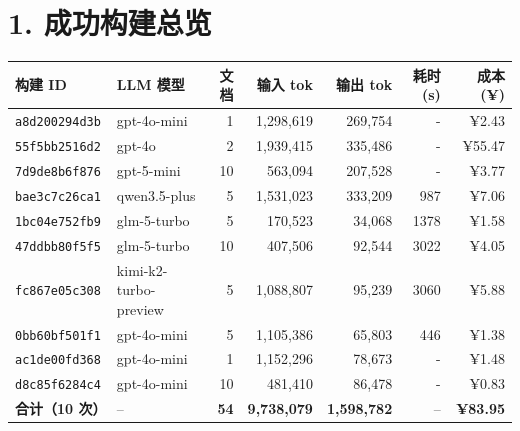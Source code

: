 \documentclass[11pt]{article}
\begin{document}
\section*{1. 成功构建总览}
\noindent\begin{tabularx}{\textwidth}{@{}l X r r r r r@{}}
\toprule
\rowcolor{headerbg!10}\textbf{构建 ID} & \textbf{LLM 模型} & \textbf{文档} & \textbf{输入 tok} & \textbf{输出 tok} & \textbf{耗时(s)} & \textbf{成本(¥)} \\
\midrule
\rowcolor{rowalt}\texttt{\small a8d200294d3b} & \small gpt-4o-mini & 1 & 1{,}298{,}619 & 269{,}754 & - & ¥2.43 \\
\texttt{\small 55f5bb2516d2} & \small gpt-4o & 2 & 1{,}939{,}415 & 335{,}486 & - & ¥55.47 \\
\rowcolor{rowalt}\texttt{\small 7d9de8b6f876} & \small gpt-5-mini & 10 & 563{,}094 & 207{,}528 & - & ¥3.77 \\
\texttt{\small bae3c7c26ca1} & \small qwen3.5-plus & 5 & 1{,}531{,}023 & 333{,}209 & 987 & ¥7.06 \\
\rowcolor{rowalt}\texttt{\small 1bc04e752fb9} & \small glm-5-turbo & 5 & 170{,}523 & 34{,}068 & 1378 & ¥1.58 \\
\texttt{\small 47ddbb80f5f5} & \small glm-5-turbo & 10 & 407{,}506 & 92{,}544 & 3022 & ¥4.05 \\
\rowcolor{rowalt}\texttt{\small fc867e05c308} & \small kimi-k2-turbo-preview & 5 & 1{,}088{,}807 & 95{,}239 & 3060 & ¥5.88 \\
\texttt{\small 0bb60bf501f1} & \small gpt-4o-mini & 5 & 1{,}105{,}386 & 65{,}803 & 446 & ¥1.38 \\
\rowcolor{rowalt}\texttt{\small ac1de00fd368} & \small gpt-4o-mini & 1 & 1{,}152{,}296 & 78{,}673 & - & ¥1.48 \\
\texttt{\small d8c85f6284c4} & \small gpt-4o-mini & 10 & 481{,}410 & 86{,}478 & - & ¥0.83 \\
\midrule
\rowcolor{headerbg!15}\textbf{合计（10 次）} & -- & \textbf{54} & \textbf{9{,}738{,}079} & \textbf{1{,}598{,}782} & -- & \textbf{¥83.95} \\
\bottomrule
\end{tabularx}
\vspace{0.1cm}
\end{document}
